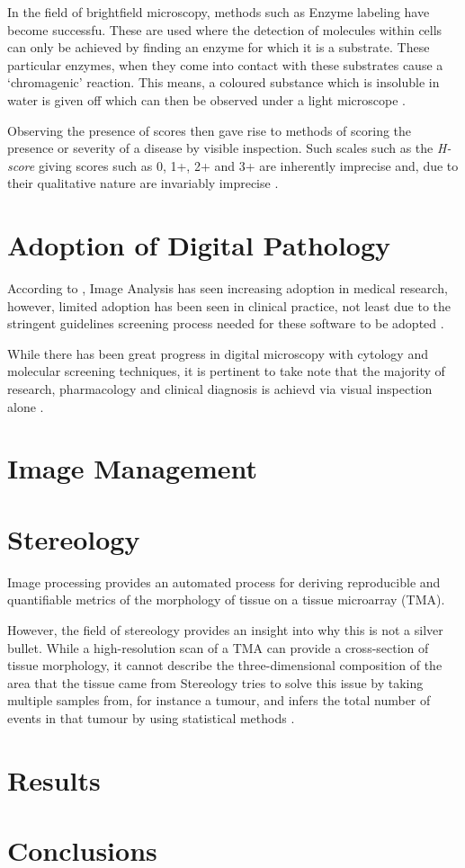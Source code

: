 \documentclass[12pt]{article}
\begin{document}
In the field of brightfield microscopy, methods such as Enzyme labeling have become successfu. These are used where 
the detection of molecules within cells can only be achieved by finding an enzyme for which it is a substrate. These 
particular enzymes, when they come into contact with these substrates cause a `chromagenic' reaction. This means, a 
coloured substance which is insoluble in water is given off which can then be observed under a light microscope 
\parencite[Ch.~2]{buchwalow2010immunohistochemistry} .

Observing the presence of scores then gave rise to methods of scoring the presence or severity of a disease by visible 
inspection. Such scales such as the \emph{H-score} giving scores such as 0, 1+, 2+ and 3+ are inherently imprecise and, 
due to their qualitative nature are invariably imprecise \parencite[Ch.~23]{dabbs2013diagnostic}.

\section{Adoption of Digital Pathology}
According to \citeauthor{dabbs2013diagnostic}, Image Analysis has seen increasing adoption in medical research, 
however, limited adoption has been seen in clinical practice, not least due to the stringent guidelines screening 
process needed for these software to be adopted \parencite[Ch.~23]{dabbs2013diagnostic}.

While there has been great progress in digital microscopy with cytology and molecular screening techniques, it is 
pertinent to take note that the majority of research, pharmacology and clinical diagnosis is achievd via visual 
inspection alone \parencite[p.~24]{mccavigan2012digital}.

\section{Image Management}

\section{Stereology}
Image processing provides an automated process for deriving reproducible and quantifiable metrics of the 
morphology of tissue on a tissue microarray (TMA).

However, the field of stereology provides an insight into why this is not a silver bullet. While a high-resolution 
scan of a TMA can provide a cross-section of tissue morphology, it cannot describe the three-dimensional 
composition of the area that the tissue came from Stereology tries to solve this issue by taking multiple samples 
from, for instance a tumour, and infers the total number of events in that tumour by using statistical methods 
\parencite{webster2014whole}.

\section{Results}\label{results}

\section{Conclusions}\label{conclusions}

\printbibliography
\end{document}

